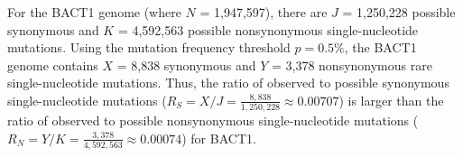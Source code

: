 For the BACT1 genome
(where $N$ = 1,947,597),
there are $J$ = 1,250,228 possible synonymous and
$K$ = 4,592,563 possible nonsynonymous single-nucleotide mutations.
%
Using the mutation frequency threshold $p = 0.5\%$,
the BACT1 genome contains
$X$ = 8,838 synonymous and
$Y$ = 3,378 nonsynonymous rare single-nucleotide mutations.
%
Thus, the ratio of observed to possible synonymous single-nucleotide mutations
($R_S = X / J = \frac{8,838}{1,250,228}
\approx 0.00707$)
is larger than the ratio of observed to possible nonsynonymous single-nucleotide mutations
($R_N = Y / K = \frac{3,378}{4,592,563}
\approx 0.00074$)
for BACT1.
\endinput